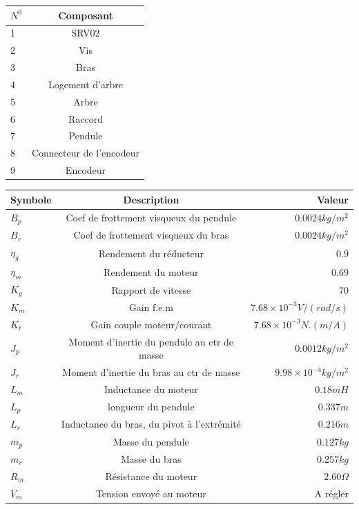 \documentclass[12pt, a4paper, openany]{report}
\begin{document}
\begin{center}
\begin{tabular}{|l|c|}
\hline \rowcolor{mauve} $N^{0}$ & Composant\\
\hline 1 & SRV02\\
\hline 2 & Vis\\
\hline 3 & Bras\\
\hline 4 & Logement d’arbre\\
\hline 5 & Arbre\\
\hline 6 & Raccord\\
\hline 7 & Pendule\\
\hline 8 & Connecteur de l'encodeur\\
\hline 9 & Encodeur\\
\hline
\end{tabular}

\end{center}

     

\begin{center}
\begin{tabular}{|l|c|r|}
\hline \rowcolor{mauve} Symbole & Description &  Valeur  \\
\hline $B_{p}$  &  Coef de frottement visqueux du pendule  & $0.0024 kg/m^{2}$   \\
\hline $B_{r}$ & Coef de frottement visqueux du bras & $0.0024 kg/m^{2}$ \\
\hline $\eta_{g}$  &  Rendement du réducteur  & $0.9$  \\
\hline $\eta_{m}$  &  Rendement du moteur  & $0.69$  \\
\hline $K_{g}$  &  Rapport de vitesse  & $70$  \\
\hline $K_{m}$  &  Gain f.e.m  & $7.68\times10^{-3} V/(rad/s)$ \\
\hline $K_{t}$  &  Gain couple moteur/courant  & $7.68\times10^{-3} N.(m/A)$\\
\hline $J_{p}$ &  Moment d'inertie du pendule au ctr de masse & $0.0012 kg/m^{2}$ \\
\hline $J_{r}$  &  Moment d'inertie du bras au ctr de masse  & $9.98\times10^{-4} kg/m^{2}$ \\
\hline $L_{m}$  &   Inductance du moteur & $0.18 mH$\\
\hline $L_{p}$  &  longueur du pendule  & $0.337 m$ \\
\hline $L_{r}$  &  Inductance du bras, du pivot à l'extrémité   & $0.216 m$ \\
\hline $m_{p}$  &  Masse du pendule  & $0.127 kg$\\
\hline $m_{r}$  &   Masse du bras  & $0.257 kg$\\
\hline $R_{m}$  &   Résistance du moteur  & $2.60 \Omega$ \\
\hline $V_{m}$  &  Tension envoyé au moteur   &  A régler \\

\hline 
\end{tabular}
\label{table12}
\end{center} 
\end{document}
